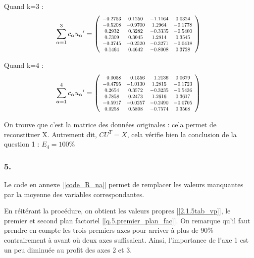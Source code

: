 \documentclass{article}
\newcommand\scalemath[2]{\scalebox{#1}{\mbox{\ensuremath{\displaystyle #2}}}} %
\begin{document}
Quand k=3 :
\[
\sum_{\alpha=1}^{3}c_{\alpha}u_{\alpha}{'}=
\left(
\scalemath{0.75}{
	\begin{array}{cccc}
    -0.2753&  0.1250& -1.1164&  0.0324\\
    -0.5208& -0.9700&  1.2964& -0.1778\\
    0.2932&  0.3282& -0.3335& -0.5400\\
    0.7309&  0.3045&  1.2814&  0.3545\\
    -0.3745& -0.2520& -0.3271& -0.0418\\
    0.1464&  0.4642& -0.8008&  0.3728\\
    \end{array}
    }
\right)   
\]

Quand k=4 :
\[
\sum_{\alpha=1}^{4}c_{\alpha}u_{\alpha}{'}=
\left(
\scalemath{0.75}{
	\begin{array}{cccc}
    -0.0058& -0.1556& -1.2136&  0.0679\\
    -0.4795& -1.0130&  1.2815& -0.1723\\
    0.2654 & 0.3572 &-0.3235& -0.5436\\
    0.7858 & 0.2473& 1.2616 & 0.3617\\
    -0.5917 &-0.0257& -0.2490& -0.0705\\
    0.0258&  0.5898 &-0.7574& 0.3568
    \end{array}
    }
\right)   
\]

On trouve que c'est la matrice des données originales : cela permet de reconstituer X. Autrement dit, $CU^{T}=X$, cela vérifie bien la conclusion de la question 1 : $E_{4}=100\%$

\subsubsection*{5.}\label{2.1.5}

Le code en annexe [\ref{code_R_na}] permet de remplacer les valeurs manquantes par la moyenne des variables correspondantes.

En réitérant la procédure, on obtient les valeurs propres [\ref{2.1.5tab_vp}], le premier et second plan factoriel [\ref{q.5.premier_plan_fac}].
On remarque qu'il faut prendre en compte les trois premiers axes pour arriver à plus de 90\% contrairement à avant où deux axes suffisaient. Ainsi, l'importance de l'axe 1 est un peu diminuée au profit des axes 2 et 3.


\end{document}
